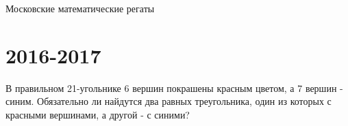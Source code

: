 \documentclass[11pt, a4paper]{common/document_template}
\begin{document}
\begin{titlepage}
  \begin{center}
	\Huge{Московские математические регаты}
  \end{center}
\end{titlepage} 


\chapter{2016-2017}

\begin{exercise}
В правильном 21-угольнике 6 вершин покрашены красным цветом, а 7 вершин - синим. Обязательно ли найдутся два равных треугольника, один из которых с красными вершинами, а другой - с синими?
\end{exercise}
\end{document}
